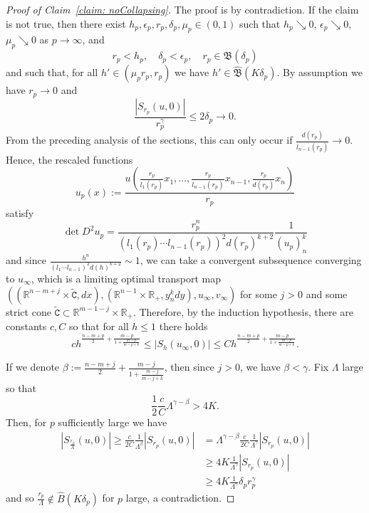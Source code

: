 \documentclass[12pt,reqno]{amsart}
\numberwithin{equation}{section}
\begin{document}
\begin{proof}[Proof of Claim~\ref{claim: noCollapsing}]
The proof is by contradiction. If the claim is not true, then there exist $h_p, \epsilon_p, r_p, \delta_p, \mu_{p} \in (0,1)$ such that $h_p \searrow 0$, $\epsilon_p \searrow 0$, $\mu_p \searrow 0$ as $p\to \infty$, and
\[
r_p<h_{p},  \quad \delta_p <\epsilon_{p}, \quad r_p \in \mathfrak{B}(\delta_p)
\]
and such that, for all $h' \in(\mu_pr_p, r_{p})$ we have $h' \in \widehat{\mathfrak{B}}(K\delta_p)$.  By assumption we have $r_p \rightarrow 0$ and 
\[
\frac{|S_{r_p}(u,0)|}{r_p^{\gamma}} \leq 2\delta_p \rightarrow 0.
\]
From the preceding analysis of the sections, this can only occur if  $\frac{d(r_p)}{l_{n-1}(r_p)} \rightarrow 0$.  Hence, the rescaled functions 
\[
u_p(x) := \frac{u(\frac{r_{p}}{l_1(r_p)}x_1, \ldots, \frac{r_p}{l_{n-1}(r_p)}x_{n-1}, \frac{r_p}{d(r_p)}x_n)}{r_p}
\]
satisfy
\[\det D^2u_p = \frac{r_p^{n}}{(l_1(r_p)\cdots l_{n-1}(r_p))^2d(r_p)^{k+2}}\frac{1}{(u_p)_n^k}\]
and since $\frac{h^{n}}{(l_1\cdots l_{n-1})^2d(h)^{k+2}}\sim 1$, we can take a convergent subsequence converging to $u_{\infty}$, which is a limiting optimal transport map $((\mathbb R^{n-m+j}\times \tilde{\mathtt C}, dx), (\mathbb R^{n-1}\times \mathbb R_+, y_n^kdy), u_{\infty}, v_{\infty})$ for some $j>0$ and some strict cone $\tilde{\mathtt C}\subset \mathbb R^{m-1-j}\times \mathbb R_+$. Therefore, by the induction hypothesis, there are constants $c, C$  so that for all $h\leq 1$ there holds 
\[
ch^{\frac{n-m+p}{2}+\frac{m-p}{1+\frac{m-p}{m-p+k}}}\leq |S_h(u_{\infty}, 0)|\leq Ch^{\frac{n-m+p}{2}+\frac{m-p}{1+\frac{m-p}{m-p+k}}}.
\]


If we denote $\beta:=\frac{n-m+j}{2}+\frac{m-j}{1+\frac{m-j}{m-j+k}}$, then since $j>0$, we have $\beta < \gamma$.  Fix $\Lambda$ large so that
\[
\frac{1}{2}\frac{c}{C}\Lambda^{\gamma-\beta}>4K.
\]
Then, for $p$ sufficiently large we have
\[
\begin{aligned}
|S_{\frac{r_p}{\Lambda}}(u, 0)|\geq \frac{c}{2C}\frac{1}{\Lambda^{\beta}}|S_{r_p}(u, 0)| &= \Lambda^{\gamma-\beta}\frac{c}{2C}\frac{1}{\Lambda^{\gamma}}|S_{r_p}(u,0)|\\
& \geq 4K\frac{1}{\Lambda^{\gamma}}|S_{r_p}(u,0)|\\
& \geq 4K\frac{1}{\Lambda^{\gamma}}\delta_pr_p^{\gamma}
\end{aligned}
\]
and so $\frac{r_p}{\Lambda} \notin \widehat{B}(K\delta_p)$ for $p$ large, a contradiction.
\end{proof}
\end{document}
